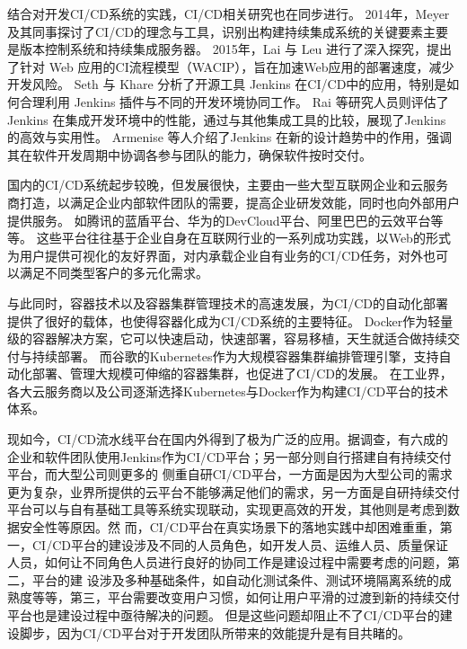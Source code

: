 结合对开发CI/CD系统的实践，CI/CD相关研究也在同步进行。
2014年，Meyer 及其同事探讨了CI/CD的理念与工具，识别出构建持续集成系统的关键要素主要是版本控制系统和持续集成服务器\cite{Meyer2014Continuous}。
2015年，Lai 与 Leu 进行了深入探究，提出了针对 Web 应用的CI流程模型（WACIP），旨在加速Web应用的部署速度，减少开发风险\cite{2016Applying}。
Seth 与 Khare 分析了开源工具 Jenkins 在CI/CD中的应用，特别是如何合理利用 Jenkins 插件与不同的开发环境协同工作\cite{7453279}。
Rai 等研究人员则评估了 Jenkins 在集成开发环境中的性能，通过与其他集成工具的比较，展现了Jenkins 的高效与实用性\cite{2015A}。
Armenise 等人介绍了Jenkins 在新的设计趋势中的作用，强调其在软件开发周期中协调各参与团队的能力，确保软件按时交付\cite{2015Continuous}。


国内的CI/CD系统起步较晚，但发展很快，主要由一些大型互联网企业和云服务商打造，以满足企业内部软件团队的需要，提高企业研发效能，同时也向外部用户提供服务。
如腾讯的蓝盾平台、华为的DevCloud平台、阿里巴巴的云效平台等等。
这些平台往往基于企业自身在互联网行业的一系列成功实践，以Web的形式为用户提供可视化的友好界面，对内承载企业自有业务的CI/CD任务，对外也可以满足不同类型客户的多元化需求。

与此同时，容器技术以及容器集群管理技术的高速发展，为CI/CD的自动化部署提供了很好的载体\cite{docker}，也使得容器化成为CI/CD系统的主要特征。
Docker作为轻量级的容器解决方案，它可以快速启动，快速部署，容易移植，天生就适合做持续交付与持续部署。
而谷歌的Kubernetes作为大规模容器集群编排管理引擎，支持自动化部署、管理大规模可伸缩的容器集群，也促进了CI/CD的发展。
在工业界，各大云服务商以及公司逐渐选择Kubernetes与Docker作为构建CI/CD平台的技术体系。

现如今，CI/CD流水线平台在国内外得到了极为广泛的应用。据调查，有六成的企业和软件团队使用Jenkins作为CI/CD平台\cite{DevOps中国调查研究}；另一部分则自行搭建自有持续交付平台，而大型公司则更多的
侧重自研CI/CD平台，一方面是因为大型公司的需求更为复杂，业界所提供的云平台不能够满足他们的需求，另一方面是自研持续交付平台可以与自有基础工具等系统实现联动，实现更高效的开发，其他则是考虑到数据安全性等原因。然
而，CI/CD平台在真实场景下的落地实践中却困难重重，第一，CI/CD平台的建设涉及不同的人员角色，如开发人员、运维人员、质量保证人员，如何让不同角色人员进行良好的协同工作是建设过程中需要考虑的问题，第二，平台的建
设涉及多种基础条件，如自动化测试条件、测试环境隔离系统的成熟度等等\cite{rangnau2020continuous}，第三，平台需要改变用户习惯，如何让用户平滑的过渡到新的持续交付平台也是建设过程中亟待解决的问题。
但是这些问题却阻止不了CI/CD平台的建设脚步，因为CI/CD平台对于开发团队所带来的效能提升是有目共睹的。

